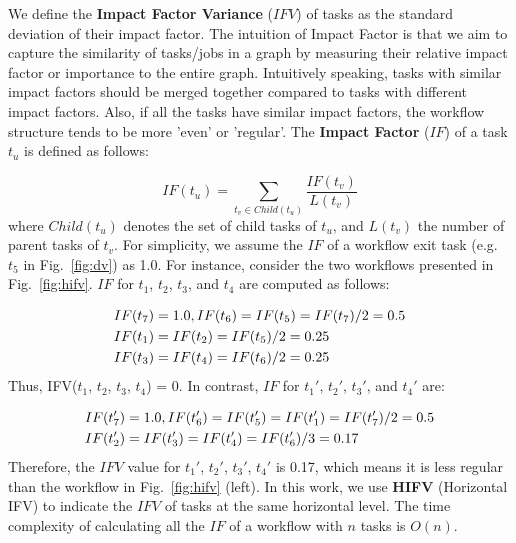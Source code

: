 \documentclass[final]{IEEEtran}
\begin{document}
We define the \textbf{Impact Factor Variance} ($IFV$) of tasks as the standard deviation of their impact factor. The intuition of Impact Factor is that we aim to capture the similarity of tasks/jobs in a graph by measuring their relative impact factor or importance to the entire graph. Intuitively speaking, tasks with similar impact factors should be merged together compared to tasks with different impact factors. Also, if all the tasks have similar impact factors, the workflow structure tends to be more 'even' or 'regular'. The \textbf{Impact Factor} ($IF$) of a task $t_u$ is defined as follows:


\begin{equation}
	IF(t_u)=\sum_{t_v\in Child(t_u)}^{}\frac{IF(t_v)}{L(t_v)}
\end{equation}
where $Child(t_u)$ denotes the set of child tasks of $t_u$, and $L(t_v)$ the number of parent tasks of $t_v$. For simplicity, we assume the $IF$ of a workflow exit task (e.g. $t_5$ in Fig.~\ref{fig:dv}) as 1.0. For instance, consider the two workflows presented in Fig.~\ref{fig:hifv}. $IF$ for $t_1$, $t_2$, $t_3$, and $t_4$ are computed as follows:

\begin{eqnarray}
	\displaystyle  
	&IF(t_7 )=1.0, IF(t_6 )=IF(t_5 )=IF(t_7 )/2=0.5\nonumber  \\
	&IF(t_1 )=IF(t_2 )=IF(t_5 )/2=0.25\nonumber \\
	&IF(t_3 )=IF(t_4 )=IF(t_6 )/2=0.25\nonumber 
\end{eqnarray}
Thus, IFV($t_1$, $t_2$, $t_3$, $t_4$) = 0. In contrast, $IF$ for $t_1'$, $t_2'$, $t_3'$, and $t_4'$ are:

\begin{eqnarray}
	\displaystyle  
	&IF(t_7')=1.0, IF(t_6')=IF(t_5')=IF(t_1')=IF(t_7')/2=0.5\nonumber \\
	&IF(t_2')=IF(t_3')=IF(t_4')=IF(t_6')/3=0.17 \nonumber
\end{eqnarray}
Therefore, the $IFV$ value for {$t_1'$, $t_2'$, $t_3'$, $t_4'$} is 0.17, which means it is less regular than the workflow in Fig.~\ref{fig:hifv} (left). In this work, we use \textbf{HIFV} (Horizontal IFV) to indicate the $IFV$ of tasks at the same horizontal level. The time complexity of calculating all the $IF$ of a workflow with $n$ tasks is $O(n)$.  
\end{document}
